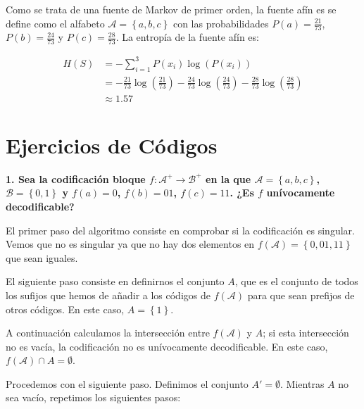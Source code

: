 \documentclass{article}
\begin{document}
Como se trata de una fuente de Markov de primer orden, la fuente afín es se define como el alfabeto $\mathcal{A}=\left\{a,b,c\right\}$ con las probabilidades $P(a) = \frac{21}{73}$, $P(b) = \frac{24}{73}$ y $P(c) = \frac{28}{73}$. La entropía de la fuente afín es:

\begin{align*}
    H(S) &= -\sum_{i=1}^{3}P(x_i)\log\left(P(x_i)\right)\\
    &= -\frac{21}{73}\log\left(\frac{21}{73}\right) - \frac{24}{73}\log\left(\frac{24}{73}\right) - \frac{28}{73}\log\left(\frac{28}{73}\right)\\
    &\approx 1.57
\end{align*}

\section{Ejercicios de Códigos}

\textbf{
1. Sea la codificación bloque $f:\mathcal{A}^+\rightarrow\mathcal{B}^+$ en la que $\mathcal{A}=\left\{a,b,c\right\}$, $\mathcal{B}=\left\{0,1\right\}$ y $f(a)=0$, $f(b) = 01$, $f(c)=11$. ¿Es $f$ unívocamente decodificable?
}

\vspace{0.5cm}

El primer paso del algoritmo consiste en comprobar si la codificación es singular. Vemos que no es singular ya que no hay dos elementos en $f\left(\mathcal{A}\right)=\left\{0,01,11\right\}$ que sean iguales.

El siguiente paso consiste en definirnos el conjunto $A$, que es el conjunto de todos los sufijos que hemos de añadir a los códigos de $f\left(\mathcal{A}\right)$ para que sean prefijos de otros códigos. En este caso, $A=\left\{1\right\}$.

A continuación calculamos la intersección entre $f\left(\mathcal{A}\right)$ y $A$; si esta intersección no es vacía, la codificación no es unívocamente decodificable. En este caso, $f\left(\mathcal{A}\right)\cap A = \emptyset$.

Procedemos con el siguiente paso. Definimos el conjunto $A'=\emptyset$. Mientras $A$ no sea vacío, repetimos los siguientes pasos:
\end{document}
